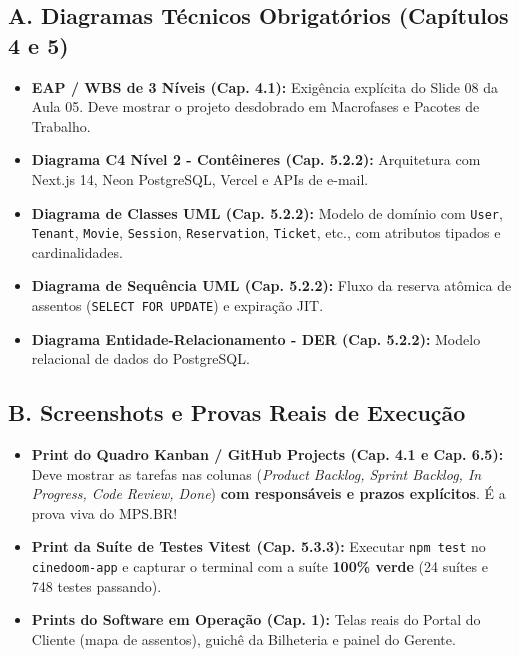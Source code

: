 \documentclass[11pt,a4paper]{article}
\begin{document}
\subsection*{A. Diagramas Técnicos Obrigatórios (Capítulos 4 e 5)}
\begin{itemize}
  \item \textbf{EAP / WBS de 3 Níveis (Cap. 4.1):} Exigência explícita do Slide 08 da Aula 05. Deve mostrar o projeto desdobrado em Macrofases e Pacotes de Trabalho.
  \item \textbf{Diagrama C4 Nível 2 - Contêineres (Cap. 5.2.2):} Arquitetura com Next.js 14, Neon PostgreSQL, Vercel e APIs de e-mail.
  \item \textbf{Diagrama de Classes UML (Cap. 5.2.2):} Modelo de domínio com \texttt{User}, \texttt{Tenant}, \texttt{Movie}, \texttt{Session}, \texttt{Reservation}, \texttt{Ticket}, etc., com atributos tipados e cardinalidades.
  \item \textbf{Diagrama de Sequência UML (Cap. 5.2.2):} Fluxo da reserva atômica de assentos (\texttt{SELECT FOR UPDATE}) e expiração JIT.
  \item \textbf{Diagrama Entidade-Relacionamento - DER (Cap. 5.2.2):} Modelo relacional de dados do PostgreSQL.
\end{itemize}

\subsection*{B. Screenshots e Provas Reais de Execução}
\begin{itemize}
  \item \textbf{Print do Quadro Kanban / GitHub Projects (Cap. 4.1 e Cap. 6.5):} Deve mostrar as tarefas nas colunas (\textit{Product Backlog, Sprint Backlog, In Progress, Code Review, Done}) \textbf{com responsáveis e prazos explícitos}. É a prova viva do MPS.BR!
  \item \textbf{Print da Suíte de Testes Vitest (Cap. 5.3.3):} Executar \texttt{npm test} no \texttt{cinedoom-app} e capturar o terminal com a suíte \textbf{100\% verde} (24 suítes e 748 testes passando).
  \item \textbf{Prints do Software em Operação (Cap. 1):} Telas reais do Portal do Cliente (mapa de assentos), guichê da Bilheteria e painel do Gerente.
\end{itemize}
\end{document}
